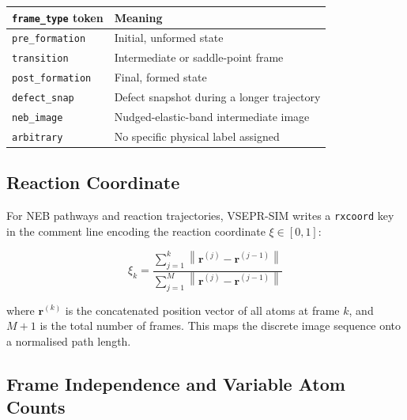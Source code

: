 \documentclass[11pt, a4paper, oneside]{article}
\newcommand{\rvec}{\mathbf{r}}
\newcommand{\norm}[1]{\left\|#1\right\|}
\begin{document}
\begin{center}
\begin{tabular}{lp{8cm}}
  \toprule
  \texttt{frame\_type} token & Meaning \\
  \midrule
  \texttt{pre\_formation}  & Initial, unformed state \\
  \texttt{transition}      & Intermediate or saddle-point frame \\
  \texttt{post\_formation} & Final, formed state \\
  \texttt{defect\_snap}    & Defect snapshot during a longer trajectory \\
  \texttt{neb\_image}      & Nudged-elastic-band intermediate image \\
  \texttt{arbitrary}       & No specific physical label assigned \\
  \bottomrule
\end{tabular}
\end{center}

\subsection{Reaction Coordinate}
\label{sec:xyzf_rxcoord}

For NEB pathways and reaction trajectories, VSEPR-SIM writes a
\texttt{rxcoord} key in the comment line encoding the reaction coordinate
$\xi \in [0,1]$:

\begin{equation}
  \xi_k = \frac{\sum_{j=1}^{k} \norm{\rvec^{(j)} - \rvec^{(j-1)}}}
               {\sum_{j=1}^{M} \norm{\rvec^{(j)} - \rvec^{(j-1)}}}
  \label{eq:rxcoord}
\end{equation}

where $\rvec^{(k)}$ is the concatenated position vector of all atoms at
frame $k$, and $M+1$ is the total number of frames. This maps the
discrete image sequence onto a normalised path length.

\subsection{Frame Independence and Variable Atom Counts}
\label{sec:xyzf_independence}
\end{document}
